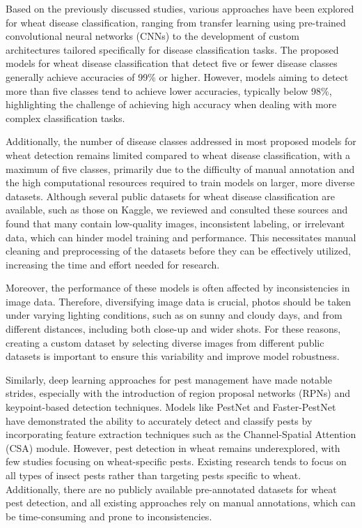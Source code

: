 \noindent Based on the previously discussed studies, various approaches have been explored for wheat disease classification, ranging from transfer learning using pre-trained convolutional neural networks (CNNs) to the development of custom architectures tailored specifically for disease classification tasks. The proposed models for wheat disease classification that detect five or fewer disease classes generally achieve accuracies of 99\% or higher. However, models aiming to detect more than five classes tend to achieve lower accuracies, typically below 98\%, highlighting the challenge of achieving high accuracy when dealing with more complex classification tasks.

\noindent Additionally, the number of disease classes addressed in most proposed models for wheat detection remains limited compared to wheat disease classification, with a maximum of five classes, primarily due to the difficulty of manual annotation and the high computational resources required to train models on larger, more diverse datasets. Although several public datasets for wheat disease classification are available, such as those on Kaggle, we reviewed and consulted these sources and found that many contain low-quality images, inconsistent labeling, or irrelevant data, which can hinder model training and performance. This necessitates manual cleaning and preprocessing of the datasets before they can be effectively utilized, increasing the time and effort needed for research.

\noindent  Moreover, the performance of these models is often affected by inconsistencies in image data. Therefore, diversifying image data is crucial, photos should be taken under varying lighting conditions, such as on sunny and cloudy days, and from different distances, including both close-up and wider shots. For these reasons, creating a custom dataset by selecting diverse images from different public datasets is important to ensure this variability and improve model robustness.

\noindent Similarly, deep learning approaches for pest management have made notable strides, especially with the introduction of region proposal networks (RPNs) and keypoint-based detection techniques. Models like PestNet and Faster-PestNet have demonstrated the ability to accurately detect and classify pests by incorporating feature extraction techniques such as the Channel-Spatial Attention (CSA) module. However, pest detection in wheat remains underexplored, with few studies focusing on wheat-specific pests. Existing research tends to focus on all types of insect pests rather than targeting pests specific to wheat. Additionally, there are no publicly available pre-annotated datasets for wheat pest detection, and all existing approaches rely on manual annotations, which can be time-consuming and prone to inconsistencies.

